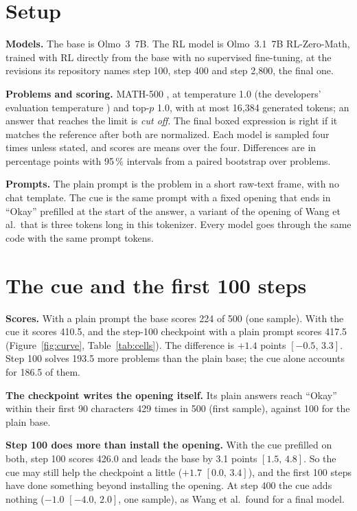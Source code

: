 \documentclass[10pt]{article}
\newcommand{\ci}[2]{$[#1,\,#2]$}
\begin{document}
\section{Setup}

\textbf{Models.} The base is Olmo~3~7B. The RL model is Olmo~3.1~7B RL-Zero-Math, trained with RL directly from
the base with no supervised fine-tuning, at the revisions its repository names step 100, step 400 and step
2{,}800, the final one.

\textbf{Problems and scoring.} MATH-500 \cite{hendrycks2021measuring,lightman2023lets}, at temperature 1.0 (the
developers' evaluation temperature \cite{ettinger2025olmo}) and top-$p$ 1.0, with at most 16{,}384 generated
tokens; an answer that reaches the limit is \emph{cut off}. The final boxed expression is right if it matches the
reference after both are normalized. Each model is sampled four times unless stated, and scores are means over the four. Differences are in
percentage points with 95\,\% intervals from a paired bootstrap over problems.

\textbf{Prompts.} The plain prompt is the problem in a short raw-text frame, with no chat template. The cue is the
same prompt with a fixed opening that ends in ``Okay'' prefilled at the start of the answer, a variant of the
opening of Wang et al.\ that is three tokens long in this tokenizer. Every model goes through the same code with
the same prompt tokens.

\section{The cue and the first 100 steps}

\textbf{Scores.} With a plain prompt the base scores 224 of 500 (one sample). With the cue it scores 410.5, and
the step-100 checkpoint with a plain prompt scores 417.5 (Figure~\ref{fig:curve}, Table~\ref{tab:cells}). The
difference is $+1.4$ points \ci{-0.5}{3.3}. Step 100 solves 193.5 more problems than the plain base; the cue
alone accounts for 186.5 of them.

\textbf{The checkpoint writes the opening itself.} Its plain answers reach ``Okay'' within their first 90
characters 429 times in 500 (first sample), against 100 for the plain base.

\textbf{Step 100 does more than install the opening.} With the cue prefilled on both, step 100 scores 426.0 and leads the base
by 3.1 points \ci{1.5}{4.8}. So the cue may still help the checkpoint a little ($+1.7$ \ci{0.0}{3.4}), and the
first 100 steps have done something beyond installing the opening. At step 400 the cue adds nothing ($-1.0$
\ci{-4.0}{2.0}, one sample), as Wang et al.\ found for a final model.
\end{document}
